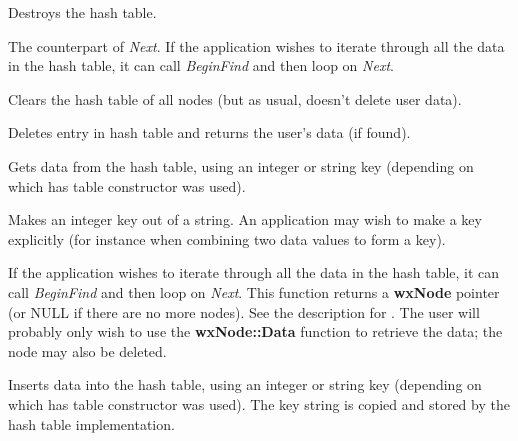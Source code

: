 

Destroys the hash table.



The counterpart of {\it Next}.  If the application wishes to iterate
through all the data in the hash table, it can call {\it BeginFind} and
then loop on {\it Next}.



Clears the hash table of all nodes (but as usual, doesn't delete user data).




Deletes entry in hash table and returns the user's data (if found).




Gets data from the hash table, using an integer or string key (depending on which
has table constructor was used).



Makes an integer key out of a string. An application may wish to make a key
explicitly (for instance when combining two data values to form a key).



If the application wishes to iterate through all the data in the hash
table, it can call {\it BeginFind} and then loop on {\it Next}. This function
returns a {\bf wxNode} pointer (or NULL if there are no more nodes).  See the
description for . The user will probably only wish to use the
{\bf wxNode::Data} function to retrieve the data; the node may also be deleted.




Inserts data into the hash table, using an integer or string key (depending on which
has table constructor was used). The key string is copied and stored by the hash
table implementation.



